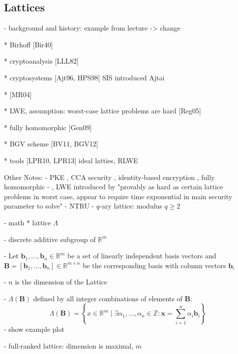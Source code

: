 \documentclass[
  a4paper,  %
  twoside,  %
  bibliography=totoc,
  headsepline,
  cleardoublepage=empty,
  parskip=half,
  draft=false
]{scrbook}
\begin{document}
\subsection{Lattices}
- background and history: example from lecture -> change %

  * Birhoff [Bir40]

  * cryptoanalysis [LLL82]

  * cryptosystems [Ajt96, HPS98]
    SIS introduced Ajtai \cite{Ajt96}

  * [MR04]

  * LWE, assumption: worst-case lattice problems are hard [Reg05]

  * fully homomorphic [Gen09]

  * BGV scheme [BV11, BGV12]

  * tools [LPR10, LPR13] ideal latties, RLWE

Other Notes: %
- PKE \cite{AD97, Reg03, Reg05}, CCA security \cite{PW08, Pei09}, identity-based encryption \cite{GPV08, CHKP10, ABB10}, fully homomorphic \cite{Gen09a}
- , LWE introduced by \cite{Reg05} "provably as hard as certain lattice problems in worst case, appear to require time exponential in main security parameter to solve"
- NTRU \cite{HPS98}
- $q$-ary lattice: modulus $q\geq 2$

- math %
  * lattice $\Lambda$ %

    

    - discrete additive subgroup of $\mathbb{R}^m$ %

    - Let $\mathbf{b}_1, \ldots, \mathbf{b}_n \in \mathbb{R}^m$ be a set of linearly independent basis vectors and $\mathbf{B} = \left[\mathbf{b}_1, \ldots, \mathbf{b}_n\right] \in \mathbb{R}^{m\times n}$ be the corresponding basis with column vectors $\mathbf{b}_i$

    - $n$ is the dimension of the Lattice

    - $\Lambda(\mathbf{B})$ defined by all integer combinations of elements of $\mathbf{B}$:
    \begin{equation}
      \Lambda(\mathbf{B}) = \left\{ x \in \mathbb{R}^m \mid \exists \alpha_1, \ldots, \alpha_n \in \mathbb{Z} : \mathbf{x} = \sum_{i=1}^n \alpha_i \mathbf{b}_i \right\}
    \end{equation} 
    - show example plot %

    - full-ranked lattice: dimension is maximal, $m$
\end{document}
